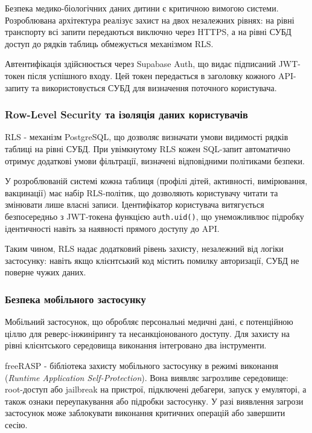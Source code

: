 Безпека медико-біологічних даних дитини є критичною вимогою системи. Розроблювана архітектура реалізує захист на двох незалежних рівнях: на рівні транспорту всі запити передаються виключно через \gls{HTTPS}, а на рівні \gls{СУБД} доступ до рядків таблиць обмежується механізмом \gls{RLS}.

Автентифікація здійснюється через Supabase Auth, що видає підписаний \gls{JWT}-токен після успішного входу. Цей токен передається в заголовку кожного \gls{API}-запиту та використовується \gls{СУБД} для визначення поточного користувача.

\subsubsection{Row-Level Security та ізоляція даних користувачів}

\gls{RLS} - механізм PostgreSQL, що дозволяє визначати умови видимості рядків таблиці на рівні \gls{СУБД}. При увімкнутому \gls{RLS} кожен \gls{SQL}-запит автоматично отримує додаткові умови фільтрації, визначені відповідними політиками безпеки.

У розроблюваній системі кожна таблиця (профілі дітей, активності, вимірювання, вакцинації) має набір \gls{RLS}-політик, що дозволяють користувачу читати та змінювати лише власні записи. Ідентифікатор користувача витягується безпосередньо з \gls{JWT}-токена функцією \texttt{auth.uid()}, що унеможливлює підробку ідентичності навіть за наявності прямого доступу до \gls{API}.

Таким чином, \gls{RLS} надає додатковий рівень захисту, незалежний від логіки застосунку: навіть якщо клієнтський код містить помилку авторизації, \gls{СУБД} не поверне чужих даних.

\subsubsection{Безпека мобільного застосунку}

Мобільний застосунок, що обробляє персональні медичні дані, є потенційною ціллю для реверс-інжинірингу та несанкціонованого доступу. Для захисту на рівні клієнтського середовища виконання інтегровано два інструменти.

freeRASP - бібліотека захисту мобільного застосунку в режимі виконання (\textit{Runtime Application Self-Protection}). Вона виявляє загрозливе середовище: root-доступ або jailbreak на пристрої, підключені дебагери, запуск у емуляторі, а також ознаки переупакування або підробки застосунку. У разі виявлення загрози застосунок може заблокувати виконання критичних операцій або завершити сесію.

